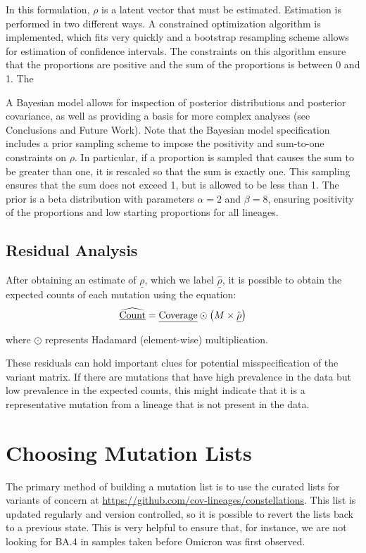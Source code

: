 \documentclass{article}
\begin{document}
In this formulation, $\rho$ is a latent vector that must be estimated.
Estimation is performed in two different ways.
A constrained optimization algorithm is implemented, which fits very quickly and a bootstrap resampling scheme allows for estimation of confidence intervals.
The constraints on this algorithm ensure that the proportions are positive and the sum of the proportions is between 0 and 1.
The 

A Bayesian model allows for inspection of posterior distributions and posterior covariance, as well as providing a basis for more complex analyses (see Conclusions and Future Work).
Note that the Bayesian model specification includes a prior sampling scheme to impose the positivity and sum-to-one constraints on $\rho$.
In particular, if a proportion is sampled that causes the sum to be greater than one, it is rescaled so that the sum is exactly one.
This sampling ensures that the sum does not exceed 1, but is allowed to be less than 1. 
The prior is a beta distribution with parameters $\alpha=2$ and $\beta=8$, ensuring positivity of the proportions and low starting proportions for all lineages.





\subsection{Residual Analysis}

After obtaining an estimate of $\underline\rho$, which we label $\hat{\underline\rho}$, it is possible to obtain the expected counts of each mutation using the equation:
$$\widehat{\text{\underline{Count}}} = \text{\underline{Coverage}}\odot\left(M\times\hat{\underline\rho}\right)$$

\noindent where $\odot$ represents Hadamard (element-wise) multiplication.

These residuals can hold important clues for potential misspecification of the variant matrix.
If there are mutations that have high prevalence in the data but low prevalence in the expected counts, this might indicate that it is a representative mutation from a lineage that is not present in the data. 

\section{Choosing Mutation Lists}

The primary method of building a mutation list is to use the curated lists for variants of concern at \url{https://github.com/cov-lineages/constellations}.
This list is updated regularly and version controlled, so it is possible to revert the lists back to a previous state.
This is very helpful to ensure that, for instance, we are not looking for BA.4 in samples taken before Omicron was first observed.
\end{document}
